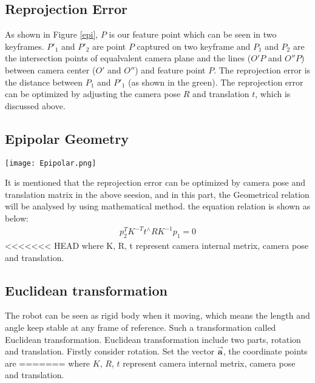 \subsection{Reprojection Error}
As shown in Figure \ref{epi}, $P$ is our feature point which can be seen in two keyframes. $P'_1$ and $P'_2$ are point $P$ captured on two keyframe and $P_1$ and $P_2$ are the intersection points of equalvalent camera plane and the lines ($O'P$ and $O''P$) between camera center ($O'$ and $O''$) and feature point $P$. The reprojection error is the distance between $P_1$ and $P'_1$ (as shown in the green). The reprojection error can be optimized by adjusting the camera pose $R$ and translation $t$, which is discussed above.

\subsection{Epipolar Geometry}
\begin{figure*}
    \centering
    \texttt{[image: Epipolar.png]}
    \caption{Epipolar Geometry and Reprojection Error}
    \label{epi}
\end{figure*}
It is mentioned that the reprojection error can be optimized by camera pose and translation matrix in the above seesion, and in this part, the Geometrical relation will be analysed by using mathematical method. the equation relation is shown as below:
\begin{align}
    p^T_2K^{-T}t^{\wedge}RK^{-1}p_1 = 0 
\end{align}
<<<<<<< HEAD
where K, R, t represent camera internal metrix, camera pose and translation.
\subsection{Euclidean transformation}
The robot can be seen as rigid body when it moving, which means the length and angle keep stable at any frame of reference. Such a transformation called Euclidean transformation. Euclidean transformation include two parts, rotation and translation. Firstly consider rotation. Set the vector $\pmb{\vec{a}}$, the coordinate points are 
=======
where $K$, $R$, $t$ represent camera internal metrix, camera pose and translation.
